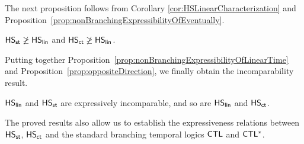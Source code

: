 The next proposition follows from Corollary \ref{cor:HSLinearCharacterization} and Proposition~\ref{prop:nonBranchingExpressibilityOfEventually}.

\begin{proposition}\label{prop:oppositeDirection} $\text{\sffamily HS}_{\mathsf{st}} \not \geq  \text{\sffamily HS}_{\mathsf{lin}} $ and $\text{\sffamily HS}_{\mathsf{ct}} \not \geq \text{\sffamily HS}_{\mathsf{lin}}$.
\end{proposition}

Putting together Proposition~\ref{prop:nonBranchingExpressibilityOfLinearTime} and Proposition~\ref{prop:oppositeDirection}, we finally obtain the incomparability result.

\begin{theorem} 
$\text{\sffamily HS}_{\mathsf{lin}}$ and $\text{\sffamily HS}_{\mathsf{st}}$  are expressively incomparable, and so are $\text{\sffamily HS}_{\mathsf{lin}}$ and $\text{\sffamily HS}_{\mathsf{ct}}$.
\end{theorem}

The proved results also allow us to establish  the  expressiveness relations between  $\text{\sffamily HS}_{\mathsf{st}}$, $\text{\sffamily HS}_{\mathsf{ct}}$ and the standard branching temporal logics $\text{\sffamily CTL}$ and $\text{\sffamily CTL$^{*}$}$.


